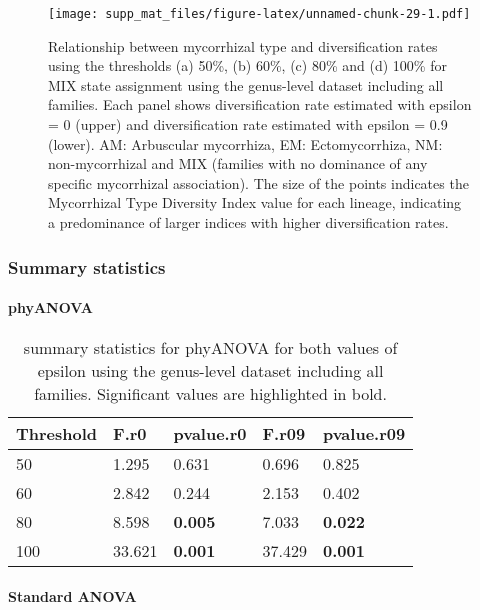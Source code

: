 \documentclass[]{article}
\let\oldparagraph\paragraph
\renewcommand{\paragraph}[1]{\oldparagraph{#1}\mbox{}}
\begin{document}
\begin{figure}
\centering
\texttt{[image: supp\_mat\_files/figure-latex/unnamed-chunk-29-1.pdf]}
\caption{Relationship between mycorrhizal type and diversification rates
using the thresholds (a) 50\%, (b) 60\%, (c) 80\% and (d) 100\% for MIX
state assignment using the genus-level dataset including all families.
Each panel shows diversification rate estimated with epsilon = 0 (upper)
and diversification rate estimated with epsilon = 0.9 (lower). AM:
Arbuscular mycorrhiza, EM: Ectomycorrhiza, NM: non-mycorrhizal and MIX
(families with no dominance of any specific mycorrhizal association).
The size of the points indicates the Mycorrhizal Type Diversity Index
value for each lineage, indicating a predominance of larger indices with
higher diversification rates.}
\end{figure}

\hypertarget{summary-statistics}{%
\subsubsection{Summary statistics}\label{summary-statistics}}

\hypertarget{phyanova-6}{%
\paragraph{phyANOVA}\label{phyanova-6}}

\begin{table}[H]

\caption{\label{tab:unnamed-chunk-30}summary statistics for phyANOVA for both values of epsilon using the genus-level dataset including all families. Significant values are highlighted in bold.}
\centering
\begin{tabular}{l|l|l|l|l}
\hline
Threshold & F.r0 & pvalue.r0 & F.r09 & pvalue.r09\\
\hline
50 & 1.295 & 0.631 & 0.696 & 0.825\\
\hline
60 & 2.842 & 0.244 & 2.153 & 0.402\\
\hline
80 & 8.598 & \textbf{0.005} & 7.033 & \textbf{0.022}\\
\hline
100 & 33.621 & \textbf{0.001} & 37.429 & \textbf{0.001}\\
\hline
\end{tabular}
\end{table}

\hypertarget{standard-anova-6}{%
\paragraph{Standard ANOVA}\label{standard-anova-6}}
\end{document}
